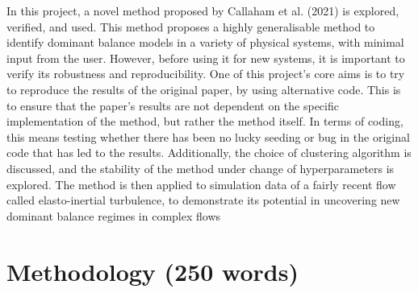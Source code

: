 \documentclass[12pt]{report} %
\begin{document}
\vspace{5mm}

In this project, a novel method proposed by Callaham et al. (2021)\cite{callaham2021learning} is explored, verified, and used. This method proposes a highly generalisable method to identify dominant balance models in a variety of physical systems, with minimal input from the user. However, before using it for new systems, it is important to verify its robustness and reproducibility. One of this project's core aims is to try to reproduce the results of the original paper, by using alternative code. This is to ensure that the paper's results are not dependent on the specific implementation of the method, but rather the method itself. In terms of coding, this means testing whether there has been no lucky seeding or bug in the original code that has led to the results. Additionally, the choice of clustering algorithm is discussed, and the stability of the method under change of hyperparameters is explored. The method is then applied to simulation data of a fairly recent flow called elasto-inertial turbulence, to demonstrate its potential in uncovering new dominant balance regimes in complex flows\cite{Samanta2012eit}

\section{Methodology (250 words)}
\end{document}
